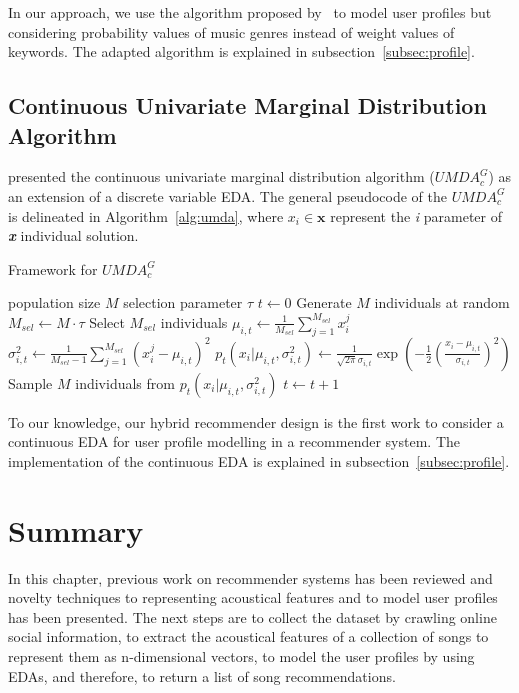 In our approach, we use the algorithm proposed by~\textcite{Liang2014781} to model user profiles but considering probability values of music genres instead of weight values of keywords. The adapted algorithm is explained in subsection~\ref{subsec:profile}.

\subsection{Continuous Univariate Marginal Distribution Algorithm}

\textcite{gallagher2007bayesian} presented the continuous univariate marginal distribution algorithm ($UMDA_c^G$) as an extension of a discrete variable EDA. The general pseudocode of the $UMDA_c^G$ is delineated in Algorithm~\ref{alg:umda}, where $x_i\in \textbf{x}$ represent the \emph{i} parameter of \textbf{\emph{x}} individual solution.

\begin{algorithm}[ht!]
	\caption{Framework for $UMDA_c^G$}
	\begin{algorithmic} 
		\REQUIRE population size $M$
		\REQUIRE selection parameter $\tau$
		\STATE $t \leftarrow 0$
		\STATE Generate $M$ individuals at random
		\STATE $M_{sel}\leftarrow M\cdot\tau$
		\STATE Select $M_{sel}$ individuals 
		\STATE $\mu_{i,t}\leftarrow\frac{1}{M_{sel}}\sum_{j=1}^{M_{sel}}x_i^j$
		\STATE $\sigma_{i,t}^2\leftarrow\frac{1}{M_{sel}-1}\sum_{j=1}^{M_{sel}}(x_i^j-\mu_{i,t})^2$ 
		\STATE $p_t({x_{i}}\vert \mu_{i,t},\sigma_{i,t}^2)\leftarrow\frac{1}{\sqrt{2\pi}\sigma_{i,t}}\exp(-\frac{1}{2}(\frac{x_i-\mu_{i,t}}{\sigma_{i,t}})^2)$
		\STATE Sample $M$ individuals from $p_t({x_{i}}\vert \mu_{i,t},\sigma_{i,t}^2)$
		\STATE $t\leftarrow t+1$
		\ENDWHILE
	\end{algorithmic}
	\label{alg:umda}
\end{algorithm}

To our knowledge, our hybrid recommender design is the first work to consider a continuous EDA for user profile modelling in a recommender system. The implementation of the continuous EDA is explained in subsection~\ref{subsec:profile}.

\section{Summary}
In this chapter, previous work on recommender systems has been reviewed and novelty techniques to representing acoustical features and to model user profiles has been presented. The next steps are to collect the dataset by crawling online social information, to extract the acoustical features of a collection of songs to represent them as n-dimensional vectors, to model the user profiles by using EDAs, and therefore, to return a list of song recommendations.